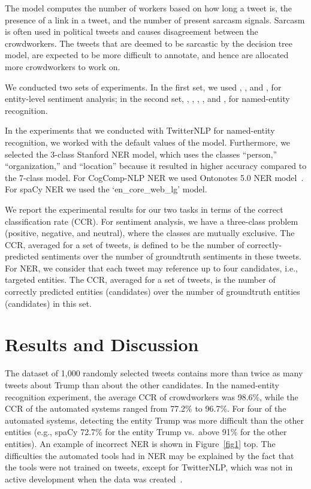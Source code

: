 \documentclass[11pt,a4paper]{article}
\begin{document}
The model computes the number of workers based on how long a tweet is, the presence of a link in a tweet, and the number of present sarcasm signals.
Sarcasm is often used in political tweets and causes disagreement between the crowdworkers. The tweets that are deemed to be
sarcastic by the decision tree model, 
are expected to be more difficult to annotate, and hence are allocated more crowdworkers to work on. 


We conducted two sets of experiments. In the first set, we used \citet{tensi}, \citet{gcnlp}, and \citet{rosette}, for entity-level sentiment analysis; in the second set, \citet{gcnlp}, \citet{spaCy}, \citet{StanfordNER}, \citet{CogCompNLP}, and \citet{twitternlp11}, \citet{rosette} for named-entity recognition.



In the experiments that we conducted with TwitterNLP for named-entity recognition, we worked with the default values of the model. Furthermore, we selected the 3-class  Stanford NER  model, which uses the classes ``person,'' ``organization,'' and ``location'' because it resulted in higher accuracy compared to the 7-class model. For CogComp-NLP NER we used Ontonotes 5.0 NER model~\citep{WeischedelPaMaHo13}. For spaCy NER we used the `en\_core\_web\_lg' model.

We report the experimental results for our two tasks in terms of the correct classification rate (CCR).  For sentiment analysis, we have a three-class problem (positive, negative, and neutral), where the classes are mutually exclusive. The CCR, averaged for a set of tweets, is defined to be the number of correctly-predicted sentiments over the number of groundtruth sentiments in these tweets. 
For NER, we consider that each tweet may reference up to four candidates, i.e., targeted entities. The CCR, averaged for a set of tweets, is the number of correctly predicted entities (candidates) over the number of groundtruth entities (candidates) in this set.


\section{Results and Discussion}
\label{sec:results}

The dataset of 1,000 randomly selected tweets contains more than twice as many tweets about Trump than about the other candidates.  In the named-entity recognition experiment, the average CCR of crowdworkers was 98.6\%, while the CCR of the automated systems ranged from 77.2\% to 96.7\%. For four of the  automated systems, detecting the entity Trump was more difficult than the other entities (e.g., spaCy 72.7\% for the entity Trump vs.\ above 91\% for the other entities).  
An example of incorrect NER is shown in Figure~\ref{fig1} top.
The difficulties the automated tools had in NER may be explained by the fact that the tools were not trained on tweets, except for TwitterNLP, which was not in active development when the data was created~\citep{FarzindarIn15}.   
\end{document}
